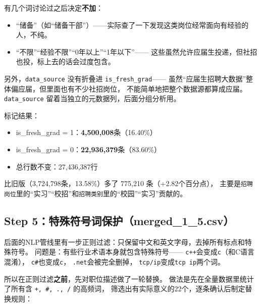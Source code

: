 \documentclass[12pt,a4paper]{ctexart}
\begin{document}
有几个词讨论过之后决定\textbf{不加}：
\begin{itemize}
\item ``储备''（如``储备干部''）——实际查了一下发现这类岗位经常面向有经验的人，不纯。
\item ``不限''``经验不限''``0年以上''``1年以下''——
这些虽然允许应届生投递，但社招也投，标上去的话会过度包含。
\end{itemize}

另外，\texttt{data\_source} 没有折叠进 \texttt{is\_fresh\_grad}——
虽然``应届生招聘大数据''整体偏应届，但里面也有不少社招岗位，
不能简单地把整个数据源都算成应届。
\texttt{data\_source} 留着当独立的元数据列，后面分组分析用。

标记结果：

\begin{itemize}
\item is\_fresh\_grad = 1：\textbf{4,500,008}条（16.40\%）
\item is\_fresh\_grad = 0：\textbf{22,936,379}条（83.60\%）
\item 总行数不变：27,436,387行
\end{itemize}

比旧版（3,724,798条，13.58\%）多了 775,210 条（+2.82个百分点），
主要是\texttt{招聘岗位}里的``实习''``校招''和\texttt{招聘类别}里的``校园''``实习''贡献的。


\subsection{Step 5：特殊符号词保护（merged\_1\_5.csv）}

后面的NLP管线里有一步正则过滤：只保留中文和英文字母，去掉所有标点和特殊符号。
问题是：有些行业术语本身就包含特殊符号——
\texttt{c++}会变成\texttt{c}（和C语言混淆），
\texttt{c\#}也变成\texttt{c}，
\texttt{.net}会被完全删掉，
\texttt{tcp/ip}变成\texttt{tcp ip}两个词。

所以在正则过滤\textbf{之前}，先对职位描述做了一轮替换。
做法是先在全量数据里统计了所有含 \texttt{+, \#, ., /} 的高频词，
筛选出有实际意义的22个，逐条确认后制定替换规则：
\end{document}
